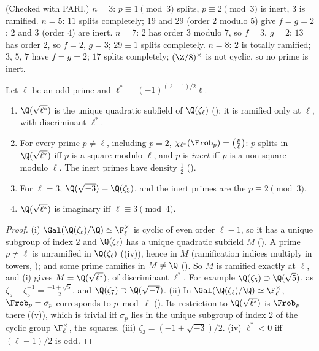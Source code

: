 \begin{example}\label{ex:ant:cyclotomicexamples}
(Checked with PARI.) $n=3$: $p\equiv1\pmod3$ splits, $p\equiv2\pmod3$ is inert, $3$ is ramified. $n=5$: $11$ splits completely; $19$ and $29$ (order $2$
modulo $5$) give $f=g=2$; $2$ and $3$ (order $4$) are inert. $n=7$: $2$ has order $3$ modulo $7$, so $f=3$, $g=2$; $13$ has order $2$, so $f=2$, $g=3$; $29\equiv1$
splits completely. $n=8$: $2$ is totally ramified; $3$, $5$, $7$ have $f=g=2$; $17$ splits completely; $(\Z/8)^\times$ is not cyclic, so no prime is inert.
\end{example}

\begin{proposition}[$\Q(\sqrt{\ell^*})$]\label{prop:ant:sqrtlstar}
Let $\ell$ be an odd prime and $\ell^*=(-1)^{(\ell-1)/2}\ell$.
\begin{enumerate}[label=(\roman*)]
\item $\Q(\sqrt{\ell^*})$ is the unique quadratic subfield of $\Q(\zeta_\ell)$ (); it is ramified only at $\ell$, with discriminant $\ell^*$.
\item For every prime $p\ne\ell$, including $p=2$, $\chi_{\ell^*}(\Frob_p)=\bigl(\frac p\ell\bigr)$: $p$ splits in $\Q(\sqrt{\ell^*})$ iff $p$ is a square modulo $\ell$, and
$p$ is \emph{inert} iff $p$ is a non-square modulo $\ell$. The inert primes have density $\frac12$ ().
\item For $\ell=3$, $\Q(\sqrt{-3})=\Q(\zeta_3)$, and the inert primes are the $p\equiv2\pmod3$.
\item $\Q(\sqrt{\ell^*})$ is imaginary iff $\ell\equiv3\pmod4$.
\end{enumerate}
\end{proposition}

\begin{proof}
(i) $\Gal(\Q(\zeta_\ell)/\Q)\simeq\F_\ell^\times$ is cyclic of even order $\ell-1$, so it has a unique subgroup of index $2$ and $\Q(\zeta_\ell)$ has a unique quadratic
subfield $M$ (). A prime $p\ne\ell$ is unramified in $\Q(\zeta_\ell)$ ((iv)), hence in $M$ (ramification indices
multiply in towers, ); and some prime ramifies in $M\ne\Q$ (). So $M$ is ramified exactly at $\ell$, and
(i) gives $M=\Q(\sqrt{\ell^*})$, of discriminant $\ell^*$. For example $\Q(\zeta_5)\supset\Q(\sqrt5)$, as $\zeta_5+\zeta_5^{-1}=\frac{-1+\sqrt5}2$, and
$\Q(\zeta_7)\supset\Q(\sqrt{-7})$. (ii) In $\Gal(\Q(\zeta_\ell)/\Q)\simeq\F_\ell^\times$, $\Frob_p=\sigma_p$ corresponds to $p\bmod\ell$
(). Its restriction to $\Q(\sqrt{\ell^*})$ is $\Frob_p$ there ((v)), which is trivial iff $\sigma_p$ lies in
the unique subgroup of index $2$ of the cyclic group $\F_\ell^\times$, the squares. (iii) $\zeta_3=(-1+\sqrt{-3})/2$. (iv) $\ell^*<0$ iff $(\ell-1)/2$ is odd.
\end{proof}

